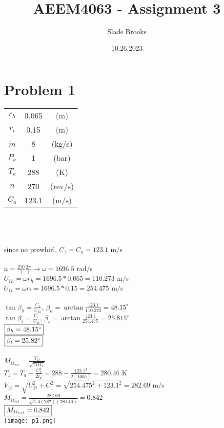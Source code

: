 \documentclass{article}
\title{AEEM4063 - Assignment 3}
\author{Slade Brooks}
\date{10.26.2023}
\begin{document}
\maketitle

\section*{Problem 1}
\begin{tabular}{ccc}
    $r_h$ & 0.065 & (m) \\
    $r_t$ & 0.15 & (m) \\
    $\dot{m}$ & 8 & (kg/s) \\
    $P_a$ & 1 & (bar) \\
    $T_a$ & 288 & (K) \\
    $n$ & 270 & (rev/s) \\
    $C_a$ & 123.1 & (m/s)
\end{tabular} \\\\\\
since no prewhirl, $C_1=C_a=123.1$ m/s \\\\
$n=\frac{270}{1}\frac{2\pi}{1} \rightarrow \omega=1696.5$ rad/s \\
$U_{1h}=\omega r_h = 1696.5*0.065 = 110.273$ m/s \\
$U_{1t}=\omega r_t = 1696.5*0.15 = 254.475$ m/s \\\\
$\tan{\beta_h}=\frac{C_1}{U_{1h}}$, \quad $\beta_h=\arctan{\frac{123.1}{110.273}}
=48.15^\circ$ \\
$\tan{\beta_t}=\frac{C_1}{U_{1t}}$, \quad $\beta_t=\arctan{\frac{123.1}{254.475}}
=25.815^\circ$ \\
$\fbox{$\beta_{h}=48.15^\circ$}$ \\
$\fbox{$\beta_{t}=25.82^\circ$}$ \\\\
$M_{1t_{rel}}=\frac{V_{1t}}{\sqrt{\gamma R T_1}}$ \\
$T_1 = T_a - \frac{C_1^2}{2c_p}=288 - \frac{123.1^2}{2(1005)}=280.46$ K \\
$V_{1t}=\sqrt{U_{1t}^2 + C_1^2}=\sqrt{254.475^2 + 123.1^2}=282.69$ m/s \\
$M_{1t_{rel}}=\frac{282.69}{\sqrt{1.4(287)(280.46)}}=0.842$ \\
$\fbox{$M_{1t_{rel}}=0.842$}$ \\
\texttt{[image: p1.png]}
\end{document}
